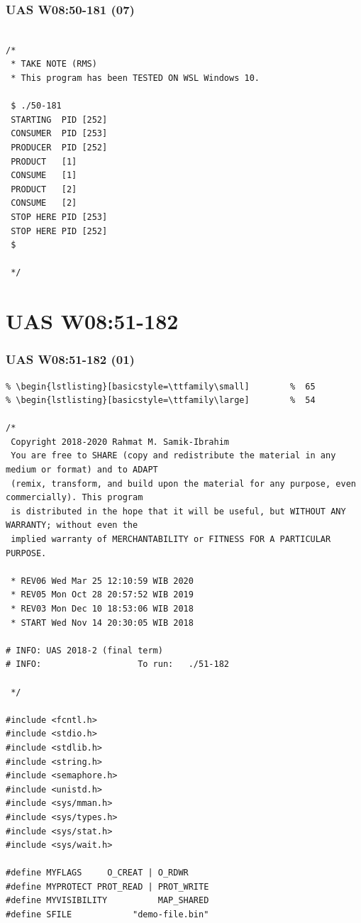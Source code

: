 \documentclass[xcolor=table, notheorems, hyperref={pdfpagelabels=false}]{beamer}
\begin{document}
\begin{frame}[fragile]
\frametitle{UAS W08:50-181 (07)}
\begin{lstlisting}[basicstyle=\ttfamily\large]        %  54

/*
 * TAKE NOTE (RMS)
 * This program has been TESTED ON WSL Windows 10.

 $ ./50-181
 STARTING  PID [252]
 CONSUMER  PID [253]
 PRODUCER  PID [252]
 PRODUCT   [1]
 CONSUME   [1]
 PRODUCT   [2]
 CONSUME   [2]
 STOP HERE PID [253]
 STOP HERE PID [252]
 $

 */

\end{lstlisting}
\end{frame}

\section{UAS W08:51-182}
\begin{frame}[fragile]
\frametitle{UAS W08:51-182 (01)}
\begin{lstlisting}[basicstyle=\ttfamily\tiny]         % 108
% \begin{lstlisting}[basicstyle=\ttfamily\footnotesize] %  72
% \begin{lstlisting}[basicstyle=\ttfamily\small]        %  65
% \begin{lstlisting}[basicstyle=\ttfamily\large]        %  54

/*
 Copyright 2018-2020 Rahmat M. Samik-Ibrahim
 You are free to SHARE (copy and redistribute the material in any medium or format) and to ADAPT 
 (remix, transform, and build upon the material for any purpose, even commercially). This program
 is distributed in the hope that it will be useful, but WITHOUT ANY WARRANTY; without even the 
 implied warranty of MERCHANTABILITY or FITNESS FOR A PARTICULAR PURPOSE.
 
 * REV06 Wed Mar 25 12:10:59 WIB 2020
 * REV05 Mon Oct 28 20:57:52 WIB 2019
 * REV03 Mon Dec 10 18:53:06 WIB 2018
 * START Wed Nov 14 20:30:05 WIB 2018

# INFO: UAS 2018-2 (final term)
# INFO:                   To run:   ./51-182 

 */

#include <fcntl.h>
#include <stdio.h>
#include <stdlib.h>
#include <string.h>
#include <semaphore.h>
#include <unistd.h>
#include <sys/mman.h>
#include <sys/types.h>
#include <sys/stat.h>
#include <sys/wait.h>

#define MYFLAGS     O_CREAT | O_RDWR
#define MYPROTECT PROT_READ | PROT_WRITE
#define MYVISIBILITY          MAP_SHARED
#define SFILE            "demo-file.bin"

\end{lstlisting}
\end{frame}
\end{document}
